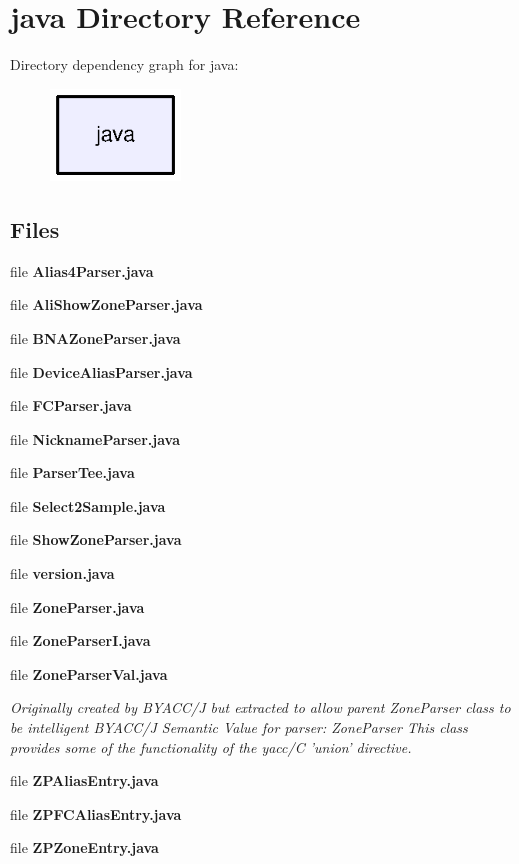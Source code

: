 \section{java Directory Reference}
\label{dir_93c6ba7fb77bae0709fae89c9c13b44a}
Directory dependency graph for java\-:\nopagebreak
\begin{figure}[H]
\begin{center}
\leavevmode
\includegraphics[width=98pt]{dir_93c6ba7fb77bae0709fae89c9c13b44a_dep}
\end{center}
\end{figure}
\subsection*{Files}
\begin{DoxyCompactItemize}
\item 
file {\bf Alias4\-Parser.\-java}
\item 
file {\bf Ali\-Show\-Zone\-Parser.\-java}
\item 
file {\bf B\-N\-A\-Zone\-Parser.\-java}
\item 
file {\bf Device\-Alias\-Parser.\-java}
\item 
file {\bf F\-C\-Parser.\-java}
\item 
file {\bf Nickname\-Parser.\-java}
\item 
file {\bf Parser\-Tee.\-java}
\item 
file {\bf Select2\-Sample.\-java}
\item 
file {\bf Show\-Zone\-Parser.\-java}
\item 
file {\bf version.\-java}
\item 
file {\bf Zone\-Parser.\-java}
\item 
file {\bf Zone\-Parser\-I.\-java}
\item 
file {\bf Zone\-Parser\-Val.\-java}
\begin{DoxyCompactList}\small\item\em Originally created by B\-Y\-A\-C\-C/\-J but extracted to allow parent Zone\-Parser class to be intelligent B\-Y\-A\-C\-C/\-J Semantic Value for parser\-: Zone\-Parser This class provides some of the functionality of the yacc/\-C 'union' directive. \end{DoxyCompactList}\item 
file {\bf Z\-P\-Alias\-Entry.\-java}
\item 
file {\bf Z\-P\-F\-C\-Alias\-Entry.\-java}
\item 
file {\bf Z\-P\-Zone\-Entry.\-java}
\end{DoxyCompactItemize}
